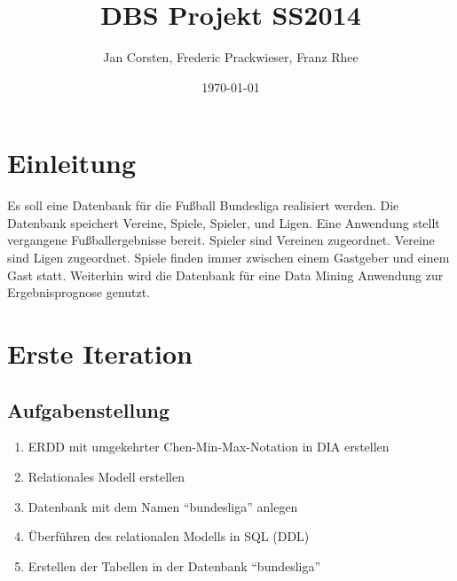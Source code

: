 \documentclass[
10pt,
a4paper
]{scrartcl}
\title{DBS Projekt SS2014}
\author{Jan Corsten, Frederic Prackwieser, Franz Rhee}
\date{\today}
\begin{document}
\maketitle
\tableofcontents



\section*{Einleitung}

Es soll eine Datenbank f\"{u}r die Fußball Bundesliga realisiert werden. Die Datenbank speichert Vereine, Spiele, Spieler, und Ligen. Eine Anwendung stellt vergangene Fußballergebnisse bereit. Spieler sind Vereinen zugeordnet. Vereine sind Ligen zugeordnet. Spiele finden immer zwischen einem Gastgeber und einem Gast statt.
Weiterhin wird die Datenbank für eine Data Mining Anwendung zur Ergebnisprognose genutzt.

\section{Erste Iteration}

\subsection{Aufgabenstellung}

\begin{enumerate}
  \item ERDD mit umgekehrter Chen-Min-Max-Notation in DIA erstellen
  \item Relationales Modell erstellen
  \item Datenbank mit dem Namen “bundesliga” anlegen
  \item Überführen des relationalen Modells in SQL (DDL)
  \item Erstellen der Tabellen in der Datenbank “bundesliga”
\end{enumerate}
\end{document}
